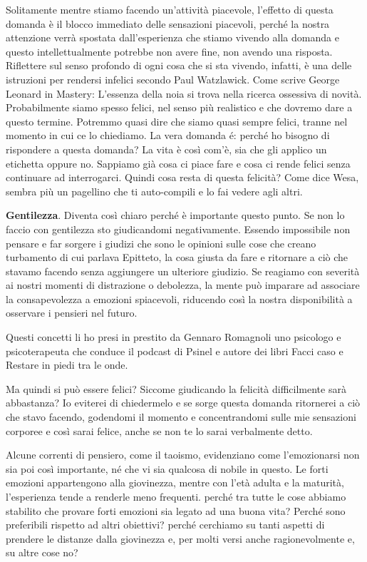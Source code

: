 \documentclass[12pt]{book} %
\begin{document}
Solitamente mentre stiamo facendo un'attività
piacevole, l'effetto di questa domanda è il blocco immediato delle sensazioni piacevoli, perché la
nostra attenzione verrà spostata dall'esperienza che stiamo vivendo alla domanda e questo
intellettualmente potrebbe non avere fine, non avendo una risposta. Riflettere sul senso profondo di ogni cosa che si sta
vivendo, infatti, è una delle istruzioni per rendersi infelici secondo Paul Watzlawick. Come scrive George
Leonard in Mastery: L'essenza della noia si trova nella ricerca ossessiva di novità. Probabilmente
siamo spesso felici, nel senso più realistico e che dovremo dare a questo termine. Potremmo quasi dire che siamo quasi sempre felici, tranne nel momento in cui ce lo chiediamo.
La vera domanda é: perché ho bisogno di rispondere a questa domanda? La vita è così com'è, sia che gli applico un etichetta oppure no. Sappiamo già cosa ci piace fare e cosa ci rende felici senza continuare ad interrogarci. Quindi cosa resta di questa felicità? Come dice Wesa, sembra più un pagellino che ti auto-compili e lo fai vedere agli altri. 

\textbf{Gentilezza}. Diventa così chiaro perché è importante questo punto. Se non lo faccio con gentilezza sto giudicandomi
negativamente. Essendo impossibile non pensare e far sorgere i giudizi che sono le opinioni sulle cose che creano
turbamento di cui parlava Epitteto, la cosa giusta da fare e ritornare a ciò che stavamo facendo senza aggiungere un
ulteriore giudizio. Se reagiamo con severità ai nostri momenti di distrazione o debolezza, la mente può imparare ad associare la consapevolezza a emozioni spiacevoli, riducendo così la nostra disponibilità a osservare i pensieri nel futuro.

Questi concetti li ho presi in prestito da Gennaro Romagnoli uno psicologo e psicoterapeuta che conduce il podcast
di Psinel e autore dei libri Facci caso e Restare in piedi tra le onde.

Ma quindi si può essere felici? Siccome giudicando la felicità difficilmente sarà abbastanza? Io eviterei di chiedermelo e se
sorge questa domanda ritornerei a ciò che stavo facendo, godendomi il momento e concentrandomi sulle mie sensazioni
corporee e così sarai felice, anche se non te lo sarai verbalmente detto. 

Alcune correnti di pensiero, come il taoismo, evidenziano come l'emozionarsi non sia poi così importante, né che vi sia qualcosa di nobile in questo. Le forti emozioni appartengono alla giovinezza, mentre con l'età adulta e la maturità, l'esperienza tende a renderle meno frequenti. perché tra tutte le cose abbiamo stabilito che provare forti emozioni sia legato ad una buona vita? Perché sono preferibili rispetto ad altri obiettivi? perché cerchiamo su tanti aspetti di prendere le distanze dalla giovinezza e, per molti versi anche ragionevolmente e, su altre cose no?
\end{document}
